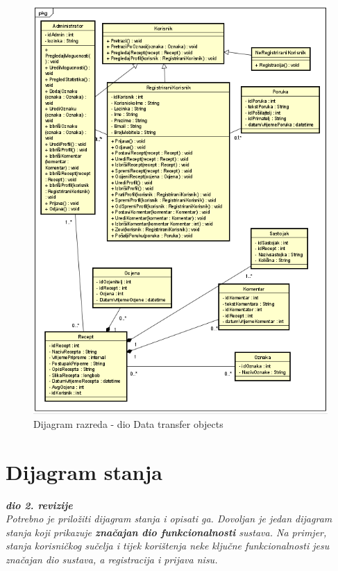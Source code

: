		\begin{figure}[H]
			\includegraphics[scale=1.3]{slike/dijagram_razreda1.png} %
			\centering
			\caption{Dijagram razreda - dio Data transfer objects}
			\label{fig:Dijagram_razreda1}
		\end{figure}
			
			
			\eject
		
		\section{Dijagram stanja}
			
			
			\textbf{\textit{dio 2. revizije}}\\
			
			\textit{Potrebno je priložiti dijagram stanja i opisati ga. Dovoljan je jedan dijagram stanja koji prikazuje \textbf{značajan dio funkcionalnosti} sustava. Na primjer, stanja korisničkog sučelja i tijek korištenja neke ključne funkcionalnosti jesu značajan dio sustava, a registracija i prijava nisu. }
			
